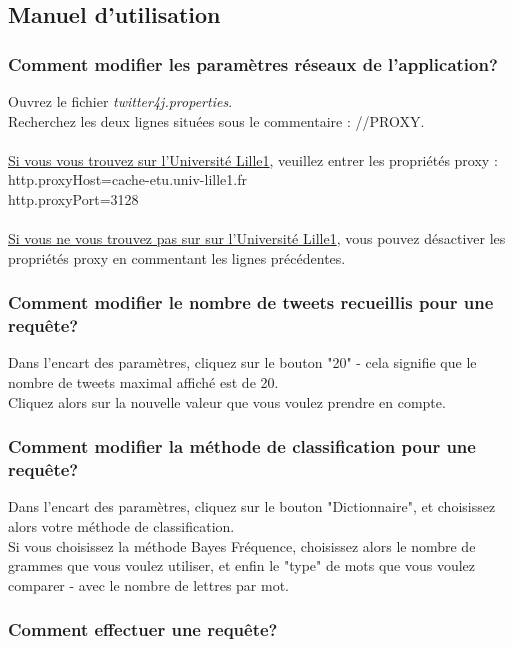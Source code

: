 \documentclass[pdftex,12pt,a4paper]{report}
\begin{document}
\begin{spacing}{1.2}
\subsection{Manuel d'utilisation}

\subsubsection{Comment modifier les paramètres réseaux de l'application?}

Ouvrez le fichier \textit{twitter4j.properties}.
\\
Recherchez les deux lignes situées sous le commentaire : //PROXY.
\\
\\
\underline{Si vous vous trouvez sur l'Université Lille1}, veuillez entrer les propriétés proxy : 
\\	http.proxyHost=cache-etu.univ-lille1.fr
\\	http.proxyPort=3128
\\
\\
\underline{Si vous ne vous trouvez pas sur sur l'Université Lille1}, vous pouvez désactiver les propriétés proxy en commentant les lignes précédentes.

\subsubsection{Comment modifier le nombre de tweets recueillis pour une requête?}

Dans l'encart des paramètres, cliquez sur le bouton "20" - cela signifie que le nombre de tweets maximal affiché est de 20.
\\
Cliquez alors sur la nouvelle valeur que vous voulez prendre en compte.

\subsubsection{Comment modifier la méthode de classification pour une requête?}

Dans l'encart des paramètres, cliquez sur le bouton "Dictionnaire", et choisissez alors votre méthode de classification.
\\
Si vous choisissez la méthode Bayes Fréquence, choisissez alors le nombre de grammes que vous voulez utiliser, et enfin le "type" de mots que vous voulez comparer - avec le nombre de lettres par mot.

\subsubsection{Comment effectuer une requête?}


\end{spacing}
\end{document}
